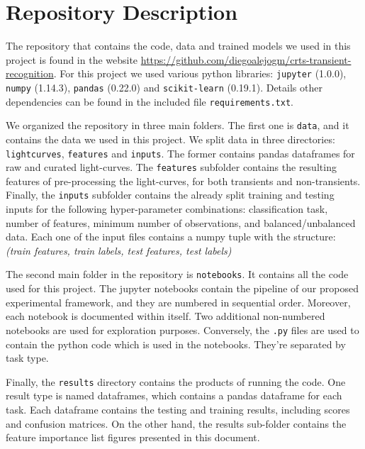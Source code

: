 \documentclass[a4paper,fleqn,usenatbib]{mnras}
\begin{document}


\appendix
\section{Repository Description} \label{section_code}

The repository that contains the code, data and trained models we used in this project is found in the website \url{https://github.com/diegoalejogm/crts-transient-recognition}. For this project we used various python libraries: \texttt{jupyter} (1.0.0), \texttt{numpy} (1.14.3), \texttt{pandas} (0.22.0) and \texttt{scikit-learn} (0.19.1). Details other dependencies can be found in the included file \texttt{requirements.txt}.

We organized the repository in three main folders. The first one is \texttt{data}, and it contains the data we used in this project. We split data in three directories: \texttt{lightcurves}, \texttt{features} and \texttt{inputs}. The former contains pandas dataframes for raw and curated light-curves. The \texttt{features} subfolder contains the resulting features of pre-processing the light-curves, for both transients and non-transients. Finally, the \texttt{inputs} subfolder contains the already split training and testing inputs for the following hyper-parameter combinations: classification task, number of features, minimum number of observations, and balanced/unbalanced data. Each one of the input files contains a numpy tuple with the structure: \textit{(train features, train labels, test features, test labels)}

The second main folder in the repository is \texttt{notebooks}. It contains all the code used for this project. The jupyter notebooks contain the pipeline of our proposed experimental framework, and they are numbered in sequential order. Moreover, each notebook is documented within itself. Two additional non-numbered notebooks are used for exploration purposes. Conversely, the \texttt{.py} files are used to contain the python code which is used in the notebooks. They're separated by task type.

Finally, the \texttt{results} directory contains the products of running the code. One result type is named dataframes, which contains a pandas dataframe for each task. Each dataframe contains the testing and training results, including scores and confusion matrices.  On the other hand, the results sub-folder contains the feature importance list figures presented in this document.
\end{document}
